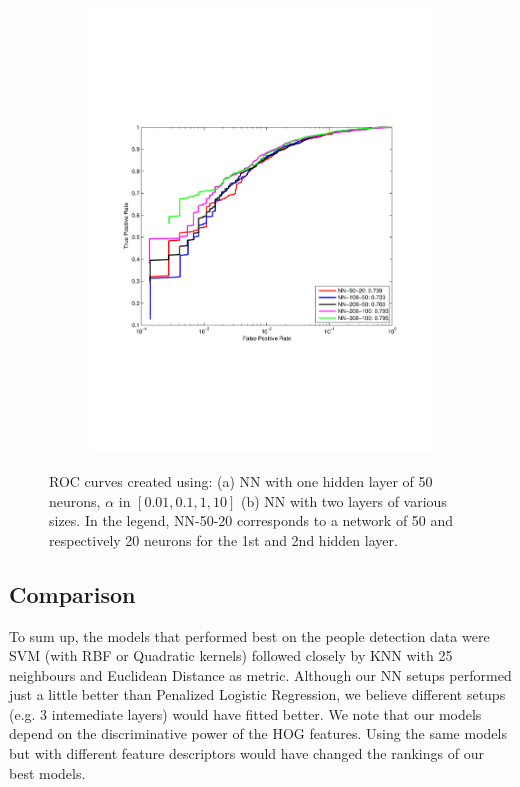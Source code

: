 \begin{figure}[h]
\begin{subfigure}[b]{0.49\textwidth}
    \includegraphics[width=\textwidth]{figures/NN-2layers.pdf}
    \caption{}
    \label{fig:NNb}
  \end{subfigure}
  \caption{ROC curves created using: (a) NN with one hidden layer of 50 neurons, $\alpha$ in $[0.01,0.1,1,10]$ (b) NN with two layers of various sizes. In the legend, NN-50-20 corresponds to a network of 50 and respectively 20  neurons for the 1st and 2nd hidden layer.}
\end{figure}

\subsection{Comparison}
To sum up, the models that performed best on the people detection data were SVM (with RBF or Quadratic kernels) followed closely by KNN with 25 neighbours and Euclidean Distance as metric. Although our NN setups performed just a little better than Penalized Logistic Regression, we believe different setups (e.g. 3 intemediate layers) would have fitted better. 
We note that our models depend on the discriminative power of the HOG features. Using the same models but with different feature descriptors would have changed the rankings of our best models. 
